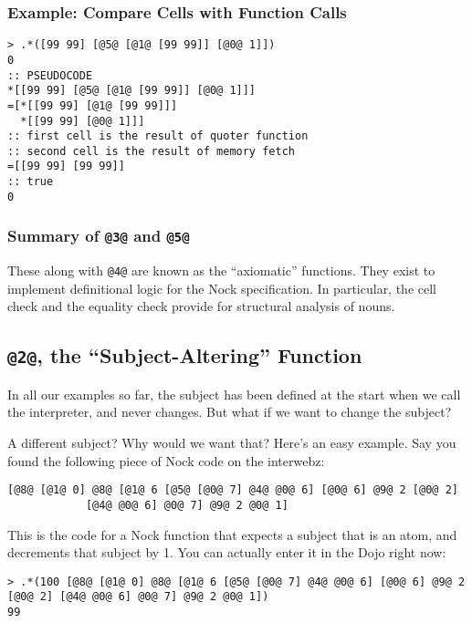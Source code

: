 \documentclass[twoside]{article}
\begin{document}
\subsubsection{Example:  Compare Cells with Function Calls}

\begin{lstlisting}[style=listingcode]
> .*([99 99] [@5@ [@1@ [99 99]] [@0@ 1]])
0
:: PSEUDOCODE
*[[99 99] [@5@ [@1@ [99 99]] [@0@ 1]]]
=[*[[99 99] [@1@ [99 99]]]
  *[[99 99] [@0@ 1]]]
:: first cell is the result of quoter function
:: second cell is the result of memory fetch
=[[99 99] [99 99]]
:: true
0
\end{lstlisting}

\subsubsection{Summary of \lstinline[style=inlinecode]{@3@} and \lstinline[style=inlinecode]{@5@}}

These along with \lstinline[style=inlinecode]{@4@} are known as the “axiomatic” functions.  They exist to implement definitional logic for the Nock specification.  In particular, the cell check and the equality check provide for structural analysis of nouns.

\subsection{\lstinline[style=inlinecode]{@2@}, the “Subject-Altering” Function}
\label{sxn:nock2}

In all our examples so far, the subject has been defined at the start when we call the interpreter, and never changes. But what if we want to change the subject?

A different subject? Why would we want that? Here's an easy example. Say you found the following piece of Nock code on the interwebz:

\begin{lstlisting}[style=listingcode]
[@8@ [@1@ 0] @8@ [@1@ 6 [@5@ [@0@ 7] @4@ @0@ 6] [@0@ 6] @9@ 2 [@0@ 2]
            [@4@ @0@ 6] @0@ 7] @9@ 2 @0@ 1]
\end{lstlisting}

This is the code for a Nock function that expects a subject that is an atom, and decrements that subject by 1. You can actually enter it in the Dojo right now:

\begin{lstlisting}[style=listingcode]
> .*(100 [@8@ [@1@ 0] @8@ [@1@ 6 [@5@ [@0@ 7] @4@ @0@ 6] [@0@ 6] @9@ 2 [@0@ 2] [@4@ @0@ 6] @0@ 7] @9@ 2 @0@ 1])
99
\end{lstlisting}
\end{document}
